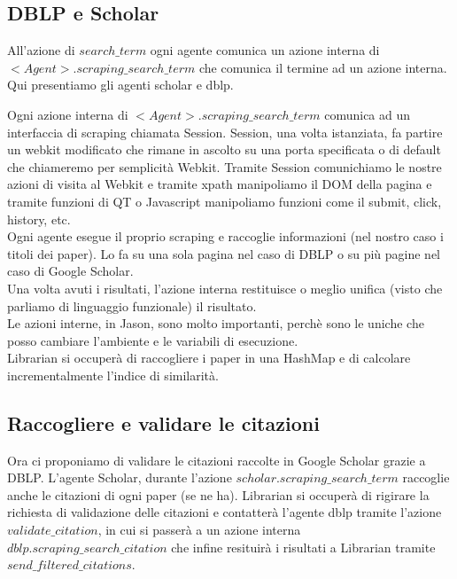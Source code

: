 \documentclass[12pt]{article}
\begin{document}
\subsection{DBLP e Scholar}
All'azione di $search\_term$ ogni agente comunica un azione interna di $<Agent>.scraping\_search\_term$ che comunica il termine ad un azione interna. Qui presentiamo gli agenti scholar e dblp.




Ogni azione interna di $<Agent>.scraping\_search\_term$ comunica ad un interfaccia di scraping chiamata Session. Session, una volta istanziata, fa partire un webkit modificato che rimane in ascolto su una porta specificata o di default che chiameremo per semplicit\`a Webkit. Tramite Session comunichiamo le nostre azioni di visita al Webkit e tramite xpath manipoliamo il DOM della pagina e tramite funzioni di QT o Javascript manipoliamo funzioni come il submit, click, history, etc. \\
Ogni agente esegue il proprio scraping e raccoglie informazioni (nel nostro caso i titoli dei paper). Lo fa su una sola pagina nel caso di DBLP o su pi\`u pagine nel caso di Google Scholar.\\
Una volta avuti i risultati, l'azione interna restituisce o meglio unifica (visto che parliamo di linguaggio funzionale) il risultato. \\
Le azioni interne, in Jason, sono molto importanti, perch\`e sono le uniche che posso cambiare l'ambiente e le variabili di esecuzione. \\ 
Librarian si occuper\`a di raccogliere i paper in una HashMap e di calcolare incrementalmente l'indice di similarit\`a. 

\subsection{Raccogliere e validare le citazioni}
Ora ci proponiamo di validare le citazioni raccolte in Google Scholar grazie a DBLP. L'agente Scholar, durante l'azione $scholar.scraping\_search\_term$ raccoglie anche le citazioni di ogni paper (se ne ha). Librarian si occuper\`a di rigirare la richiesta di validazione delle citazioni e contatter\`a l'agente dblp tramite l'azione $validate\_citation$, in cui si passer\`a a un azione interna $dblp.scraping\_search\_citation$ che infine resituir\`a i risultati a Librarian tramite $send\_filtered\_citations$.

\end{document}
